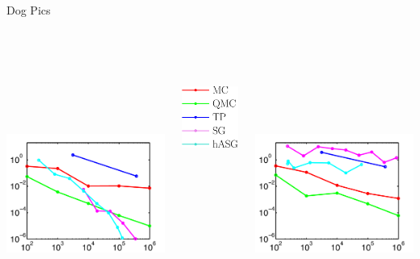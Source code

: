 \documentclass[final]{beamer}
\begin{document}
\begin{frame}{}
{\begin{columns}[t]
\begin{column}{.30\linewidth}
\begin{block}{\centering Dog Pics}
\begin{columns}[T]
\begin{column}{12cm}{}
\includegraphics[height=10cm, width = 14cm]{figures/gaussian5errors}\\
\end{column}
\begin{column}{4cm}{}
\vspace{2cm}
\centering\includegraphics[height=5cm,width=5cm]{figures/legend}\\
\end{column}
\begin{column}{14cm}{}
\includegraphics[height=10cm, width = 14cm]{figures/maxgaussian5errors}\\

\end{column}
\end{columns}
\end{block}
\end{column}
\end{columns}}
\end{frame}
\end{document}
